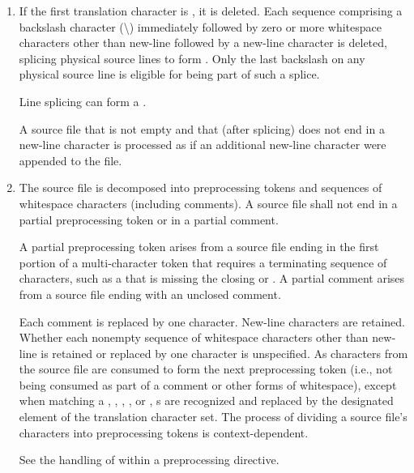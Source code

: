 \begin{enumerate}
\item
{}%
If the first translation character is ,
it is deleted.
Each sequence comprising a backslash character (\textbackslash)
immediately followed by
zero or more whitespace characters other than new-line followed by
a new-line character is deleted, splicing
physical source lines to form . Only the last
backslash on any physical source line is eligible for being part
of such a splice.
\begin{note}
Line splicing can form
a .
\end{note}
A source file that is not empty and that (after splicing)
does not end in a new-line character
is processed as if an additional new-line character were appended
to the file.

\item The source file is decomposed into preprocessing
tokens and sequences of whitespace characters
(including comments). A source file shall not end in a partial
preprocessing token or in a partial comment.
\begin{note}
A partial preprocessing
token arises from a source file
ending in the first portion of a multi-character token that requires a
terminating sequence of characters, such as a 
that is missing the closing 
or \tcode{>}. A partial comment
arises from a source file ending with an unclosed \tcode{/*}
comment.
\end{note}
Each comment is replaced by one  character. New-line characters are
retained. Whether each nonempty sequence of whitespace characters other
than new-line is retained or replaced by one  character is
unspecified.
As characters from the source file are consumed
to form the next preprocessing token
(i.e., not being consumed as part of a comment or other forms of whitespace),
except when matching a
,
,
,
, or
,
s are recognized and
replaced by the designated element of the translation character set.
The process of dividing a source file's
characters into preprocessing tokens is context-dependent.
\begin{example}
See the handling of \tcode{<} within a  preprocessing
directive.
\end{example}


\end{enumerate}
